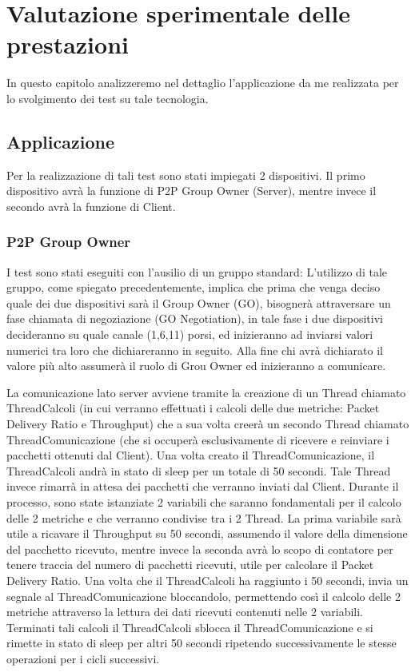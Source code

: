 \chapter{Valutazione sperimentale delle prestazioni}
In questo capitolo analizzeremo nel dettaglio l'applicazione da me realizzata per lo svolgimento dei test su tale tecnologia.

\section{Applicazione}
Per la realizzazione di tali test sono stati impiegati 2 dispositivi.
Il primo dispositivo avrà la funzione di P2P Group Owner (Server), mentre invece il secondo avrà la funzione di Client.

\subsection{P2P Group Owner}
I test sono stati eseguiti con l'ausilio di un gruppo standard:
L'utilizzo di tale gruppo, come spiegato precedentemente, implica che prima che venga deciso quale dei due dispositivi sarà il Group Owner (GO), bisognerà attraversare un fase chiamata di negoziazione (GO Negotiation), in tale fase i due dispositivi decideranno su quale canale (1,6,11) porsi, ed inizieranno ad inviarsi valori numerici tra loro che dichiareranno in seguito.
Alla fine chi avrà dichiarato il valore più alto assumerà il ruolo di Grou Owner ed inizieranno a comunicare.

La comunicazione lato server avviene tramite la creazione di un Thread chiamato ThreadCalcoli (in cui verranno effettuati i calcoli delle due metriche: Packet Delivery Ratio e Throughput) che a sua volta creerà un secondo Thread chiamato ThreadComunicazione (che si occuperà esclusivamente di ricevere e reinviare i pacchetti ottenuti dal Client).
Una volta creato il ThreadComunicazione, il ThreadCalcoli andrà in stato di sleep per un totale di 50 secondi.
Tale Thread invece rimarrà in attesa dei pacchetti che verranno inviati dal Client.
Durante il processo, sono state istanziate 2 variabili che saranno fondamentali per il calcolo delle 2 metriche e che verranno condivise tra i 2 Thread.
La prima variabile sarà utile a ricavare il Throughput su 50 secondi, assumendo il valore della dimensione del pacchetto ricevuto, mentre invece la seconda avrà lo scopo di contatore per tenere traccia del numero di pacchetti ricevuti, utile per calcolare il Packet Delivery Ratio.
Una volta che il ThreadCalcoli ha raggiunto i 50 secondi, invia un segnale al ThreadComunicazione bloccandolo, permettendo così il calcolo delle 2 metriche attraverso la lettura dei dati ricevuti contenuti nelle 2 variabili.
Terminati tali calcoli il ThreadCalcoli sblocca il ThreadComunicazione e si rimette in stato di sleep per altri 50 secondi ripetendo successivamente le stesse operazioni per i cicli successivi.


